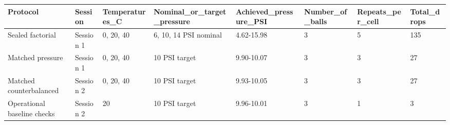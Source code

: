 \begin{tabular}{llllllll}
\hline
Protocol & Session & Temperatures\_C & Nominal\_or\_target\_pressure & Achieved\_pressure\_PSI & Number\_of\_balls & Repeats\_per\_cell & Total\_drops \\
\hline
Sealed factorial & Session 1 & 0, 20, 40 & 6, 10, 14 PSI nominal & 4.62-15.98 & 3 & 5 & 135 \\
Matched pressure & Session 1 & 0, 20, 40 & 10 PSI target & 9.90-10.07 & 3 & 3 & 27 \\
Matched counterbalanced & Session 2 & 0, 20, 40 & 10 PSI target & 9.93-10.05 & 3 & 3 & 27 \\
Operational baseline checks & Session 2 & 20 & 10 PSI target & 9.96-10.01 & 3 & 1 & 3 \\
\hline
\end{tabular}
